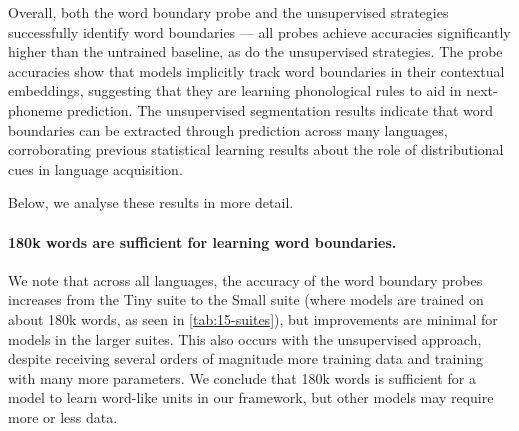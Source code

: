 Overall, both the word boundary probe and the unsupervised strategies successfully identify word boundaries --- all probes achieve accuracies significantly higher than the untrained baseline, as do the unsupervised strategies. The probe accuracies show that models implicitly track word boundaries in their contextual embeddings, suggesting that they are learning phonological rules to aid in next-phoneme prediction. The unsupervised segmentation results indicate that word boundaries can be extracted through prediction across many languages, corroborating previous statistical learning results about the role of distributional cues in language acquisition.

Below, we analyse these results in more detail.

\paragraph{180k words are sufficient for learning word boundaries.}
We note that across all languages, the accuracy of the word boundary probes increases from the Tiny suite to the Small suite (where models are trained on about 180k words, as seen in \cref{tab:15-suites}), but improvements are minimal for models in the larger suites. This also occurs with the unsupervised approach, despite receiving several orders of magnitude more training data and training with many more parameters. We conclude that 180k words is sufficient for a model to learn word-like units in our framework, but other models may require more or less data. 




